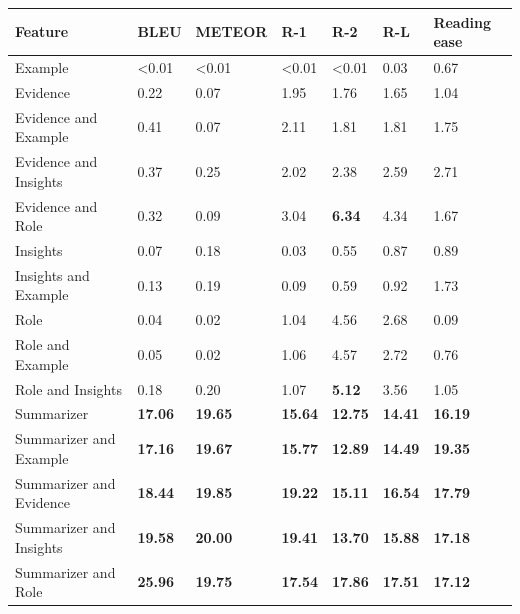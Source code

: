 \begin{tabular}{|l|l|l|l|l|l|l|}
\hline
\textbf{Feature} & BLEU & METEOR & R-1 & R-2 & R-L & Reading ease \\
 \hline
 Example & \textless{}0.01 & \textless{}0.01 & \textless{}0.01 & \textless{}0.01 & 0.03 & 0.67 \\
 \hline
 Evidence & 0.22 & 0.07 & 1.95 & 1.76 & 1.65 & 1.04 \\
 \hline
 Evidence and Example & 0.41 & 0.07 & 2.11 & 1.81 & 1.81 & 1.75 \\
 \hline
 Evidence and Insights & 0.37 & 0.25 & 2.02 & 2.38 & 2.59 & 2.71 \\
 \hline
 Evidence and Role & 0.32 & 0.09 & 3.04 & \textbf{6.34} & 4.34 & 1.67 \\
 \hline
 Insights & 0.07 & 0.18 & 0.03 & 0.55 & 0.87 & 0.89 \\
 \hline
 Insights and Example & 0.13 & 0.19 & 0.09 & 0.59 & 0.92 & 1.73 \\
 \hline
 Role & 0.04 & 0.02 & 1.04 & 4.56 & 2.68 & 0.09 \\
 \hline
 Role and Example & 0.05 & 0.02 & 1.06 & 4.57 & 2.72 & 0.76 \\
 \hline
 Role and Insights & 0.18 & 0.20 & 1.07 & \textbf{5.12} & 3.56 & 1.05 \\
 \hline
 Summarizer & \textbf{17.06} & \textbf{19.65} & \textbf{15.64} & \textbf{12.75} & \textbf{14.41} & \textbf{16.19} \\
 \hline
 Summarizer and Example & \textbf{17.16} & \textbf{19.67} & \textbf{15.77} & \textbf{12.89} & \textbf{14.49} & \textbf{19.35} \\
 \hline
 Summarizer and Evidence & \textbf{18.44} & \textbf{19.85} & \textbf{19.22} & \textbf{15.11} & \textbf{16.54} & \textbf{17.79} \\
 \hline
 Summarizer and Insights & \textbf{19.58} & \textbf{20.00} & \textbf{19.41} & \textbf{13.70} & \textbf{15.88} & \textbf{17.18} \\
 \hline
 Summarizer and Role & \textbf{25.96} & \textbf{19.75} & \textbf{17.54} & \textbf{17.86} & \textbf{17.51} & \textbf{17.12} \\
\hline
\end{tabular}
